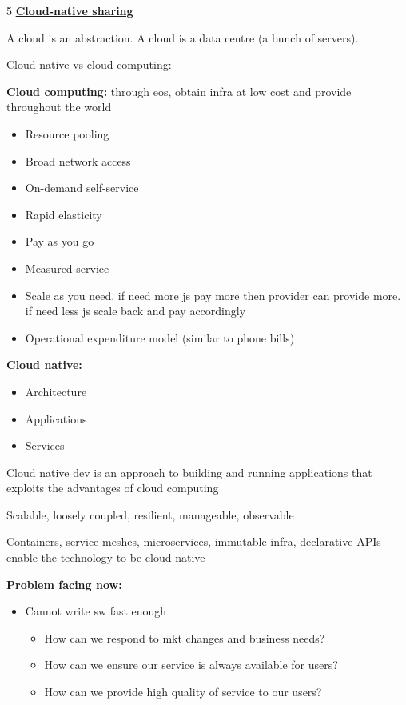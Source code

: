 \documentclass[landscape,a4paper]{extarticle}
\begin{document}
\begin{multicols*}{5}
    \textbf{\uline{Cloud-native sharing}}

    A cloud is an abstraction. A cloud is a data centre (a bunch of servers). 

    Cloud native vs cloud computing:

    \textbf{Cloud computing:} through eos, obtain infra at low cost and provide throughout the world

    \begin{itemize}
        \item Resource pooling
        \item Broad network access
        \item On-demand self-service
        \item Rapid elasticity
        \item Pay as you go
        \item Measured service
        \item Scale as you need. if need more js pay more then provider can provide more. if need less js scale back and pay accordingly
        \item Operational expenditure model (similar to phone bills)
    \end{itemize}

    \textbf{Cloud native:} 
    \begin{itemize}
        \item Architecture
        \item Applications
        \item Services
    \end{itemize}

    Cloud native dev is an approach to building and running applications that exploits the advantages of cloud computing

    Scalable, loosely coupled, resilient, manageable, observable

    Containers, service meshes, microservices, immutable infra, declarative APIs enable the technology to be cloud-native

    \textbf{Problem facing now:}

    \begin{itemize}
        \item Cannot write sw fast enough
        \begin{itemize}
            \item How can we respond to mkt changes and business needs?
            \item How can we ensure our service is always available for users?
            \item How can we provide high quality of service to our users?
        \end{itemize}
    \end{itemize}


\end{multicols*}
\end{document}
